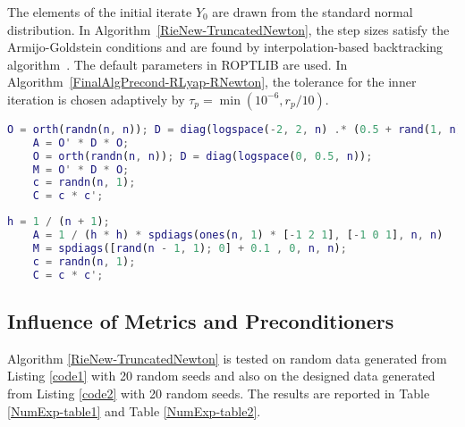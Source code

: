 \documentclass[11pt]{article}
\newcommand{\whcomm}[2]{{\sf\color{purple} #1}{\sf\color{blue} #2}}
\numberwithin{equation}{section}
\begin{document}
The elements of the initial iterate $Y_0$ are drawn from the standard normal distribution. In Algorithm~\ref{RieNew-TruncatedNewton}, the step sizes satisfy the Armijo-Goldstein conditions and are found by interpolation-based backtracking algorithm~\cite{DS1983}. The default parameters in ROPTLIB are used.
In Algorithm~\ref{FinalAlgPrecond-RLyap-RNewton}, the tolerance for the inner iteration is chosen adaptively by $\tau_p= \min(10^{-6}, r_p / 10)$. %

{\scriptsize\begin{lstlisting}[language=MATLAB,caption=random data,label=code1]
    O = orth(randn(n, n)); D = diag(logspace(-2, 2, n) .* (0.5 + rand(1, n)));
    A = O' * D * O;
    O = orth(randn(n, n)); D = diag(logspace(0, 0.5, n));
    M = O' * D * O;
    c = randn(n, 1);
    C = c * c';
\end{lstlisting}}

{\scriptsize\begin{lstlisting}[language=MATLAB,caption=the finite difference discretized $2D$ poisson problem on the square,label=code2]
	h = 1 / (n + 1);
	A = 1 / (h * h) * spdiags(ones(n, 1) * [-1 2 1], [-1 0 1], n, n)
	M = spdiags([rand(n - 1, 1); 0] + 0.1 , 0, n, n);
	c = randn(n, 1);
	C = c * c';
\end{lstlisting}}




\subsection{Influence of Metrics and Preconditioners}

Algorithm \ref{RieNew-TruncatedNewton} is tested on random data generated from Listing \ref{code1} with 20 random seeds and also on the designed data generated from Listing \ref{code2} with 20 random seeds. The results are reported in Table \ref{NumExp-table1} and Table \ref{NumExp-table2}. 
\end{document}
